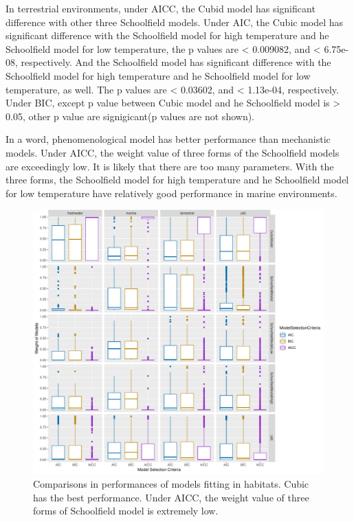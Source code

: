 \documentclass[11pt]{article}
\begin{document}
	In terrestrial environments, under AICC, the Cubid model has significant difference with other three Schoolfield models. Under AIC, the Cubic model has significant difference with the Schoolfield model for high temperature and he Schoolfield model for low temperature, the p values are < 0.009082, and < 6.75e-08, respectively. And the Schoolfield model has significant difference with the Schoolfield model for high temperature and he Schoolfield model for low temperature, as well. The p values are < 0.03602, and < 1.13e-04, respectively. Under BIC, except p value between Cubic model and he Schoolfield model is > 0.05, other p value are signigicant(p values are not shown).
	
	In a word, phenomenological model has better performance than mechanistic models. Under AICC, the weight value of three forms of the Schoolfield models are exceedingly low. It is likely that there are too many parameters\citep{johnson2004model}. With the three forms, the Schoolfield model for high temperature and he Schoolfield model for low temperature have relatively good performance in marine environments. 
	 
	
	
		\begin{figure}[H]
		\centering
		\includegraphics[width = \textwidth]{../Results/habitat.pdf}
		\caption{Comparisons in performances of models fitting in habitats. Cubic has the best performance. Under AICC, the weight value of three forms of Schoolfield model is extremely low.}
	\end{figure}
	
\end{document}
